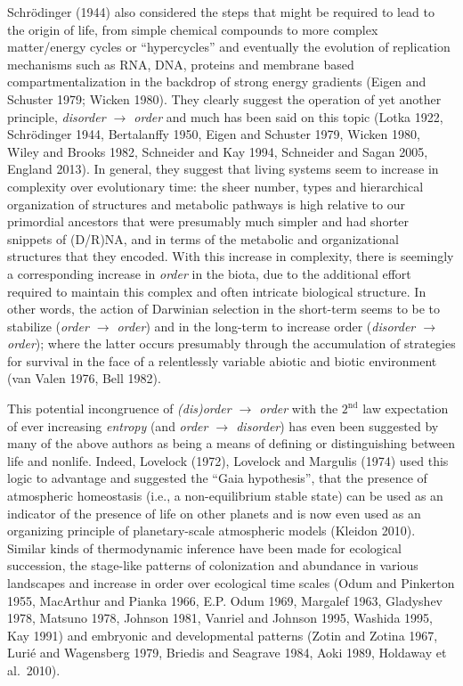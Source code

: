 \documentclass[11pt,letterpaper,]{paper}
\begin{document}
Schrödinger (1944) also considered the steps that might be required to
lead to the origin of life, from simple chemical compounds to more
complex matter/energy cycles or ``hypercycles'' and eventually the
evolution of replication mechanisms such as RNA, DNA, proteins and
membrane based compartmentalization in the backdrop of strong energy
gradients (Eigen and Schuster 1979; Wicken 1980). They clearly suggest
the operation of yet another principle, \emph{disorder \(\rightarrow\)
order} and much has been said on this topic (Lotka 1922, Schrödinger
1944, Bertalanffy 1950, Eigen and Schuster 1979, Wicken 1980, Wiley and
Brooks 1982, Schneider and Kay 1994, Schneider and Sagan 2005, England
2013). In general, they suggest that living systems seem to increase in
complexity over evolutionary time: the sheer number, types and
hierarchical organization of structures and metabolic pathways is high
relative to our primordial ancestors that were presumably much simpler
and had shorter snippets of (D/R)NA, and in terms of the metabolic and
organizational structures that they encoded. With this increase in
complexity, there is seemingly a corresponding increase in \emph{order}
in the biota, due to the additional effort required to maintain this
complex and often intricate biological structure. In other words, the
action of Darwinian selection in the short-term seems to be to stabilize
(\emph{order \(\rightarrow\) order}) and in the long-term to increase
order (\emph{disorder \(\rightarrow\) order}); where the latter occurs
presumably through the accumulation of strategies for survival in the
face of a relentlessly variable abiotic and biotic environment (van
Valen 1976, Bell 1982).

This potential incongruence of \emph{(dis)order \(\rightarrow\) order}
with the \(2^\text{nd}\) law expectation of ever increasing
\emph{entropy} (and \emph{order \(\rightarrow\) disorder}) has even been
suggested by many of the above authors as being a means of defining or
distinguishing between life and nonlife. Indeed, Lovelock (1972),
Lovelock and Margulis (1974) used this logic to advantage and suggested
the ``Gaia hypothesis'', that the presence of atmospheric homeostasis
(i.e., a non-equilibrium stable state) can be used as an indicator of
the presence of life on other planets and is now even used as an
organizing principle of planetary-scale atmospheric models (Kleidon
2010). Similar kinds of thermodynamic inference have been made for
ecological succession, the stage-like patterns of colonization and
abundance in various landscapes and increase in order over ecological
time scales (Odum and Pinkerton 1955, MacArthur and Pianka 1966, E.P.
Odum 1969, Margalef 1963, Gladyshev 1978, Matsuno 1978, Johnson 1981,
Vanriel and Johnson 1995, Washida 1995, Kay 1991) and embryonic and
developmental patterns (Zotin and Zotina 1967, Lurié and Wagensberg
1979, Briedis and Seagrave 1984, Aoki 1989, Holdaway et al.~2010).
\end{document}
